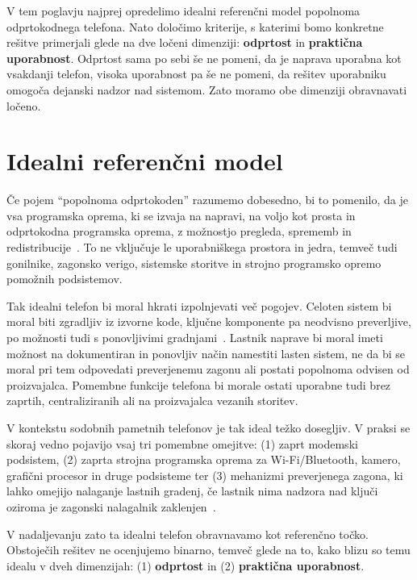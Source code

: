 \documentclass[a4paper,12pt,openright]{book}
\begin{document}
V tem poglavju najprej opredelimo idealni referenčni model popolnoma odprtokodnega telefona.
Nato določimo kriterije, s katerimi bomo konkretne rešitve primerjali glede na dve ločeni dimenziji: \textbf{odprtost} in \textbf{praktična uporabnost}.
Odprtost sama po sebi še ne pomeni, da je naprava uporabna kot vsakdanji telefon, visoka uporabnost pa še ne pomeni, da rešitev uporabniku omogoča dejanski nadzor nad sistemom.
Zato moramo obe dimenziji obravnavati ločeno.

\section{Idealni referenčni model}
\label{sec:model_definicija}

Če pojem \enquote{popolnoma odprtokoden} razumemo dobesedno, bi to pomenilo, da je vsa programska oprema, ki se izvaja na napravi, na voljo kot prosta in odprtokodna programska oprema, z možnostjo pregleda, sprememb in redistribucije~\cite{osi_osd,fsf_free_software}.
To ne vključuje le uporabniškega prostora in jedra, temveč tudi gonilnike, zagonsko verigo, sistemske storitve in strojno programsko opremo pomožnih podsistemov.

Tak idealni telefon bi moral hkrati izpolnjevati več pogojev.
Celoten sistem bi moral biti zgradljiv iz izvorne kode, ključne komponente pa neodvisno preverljive, po možnosti tudi s ponovljivimi gradnjami~\cite{reproducible_builds}.
Lastnik naprave bi moral imeti možnost na dokumentiran in ponovljiv način namestiti lasten sistem, ne da bi se moral pri tem odpovedati preverjenemu zagonu ali postati popolnoma odvisen od proizvajalca.
Pomembne funkcije telefona bi morale ostati uporabne tudi brez zaprtih, centraliziranih ali na proizvajalca vezanih storitev.

V kontekstu sodobnih pametnih telefonov je tak ideal težko dosegljiv.
V praksi se skoraj vedno pojavijo vsaj tri pomembne omejitve:
(1) zaprt modemski podsistem,
(2) zaprta strojna programska oprema za Wi-Fi/Bluetooth, kamero, grafični procesor in druge podsisteme
ter (3) mehanizmi preverjenega zagona, ki lahko omejijo nalaganje lastnih gradenj, če lastnik nima nadzora nad ključi oziroma je zagonski nalagalnik zaklenjen~\cite{android_verified_boot}.

V nadaljevanju zato ta idealni telefon obravnavamo kot referenčno točko.
Obstoječih rešitev ne ocenjujemo binarno, temveč glede na to, kako blizu so temu idealu v dveh dimenzijah:
(1) \textbf{odprtost} in
(2) \textbf{praktična uporabnost}.
\end{document}
